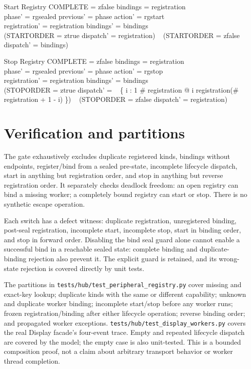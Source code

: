 \documentclass[a4paper,10pt,fleqn]{article}
\begin{document}
\begin{schema}{Start}
  \Delta Registry
\where
  COMPLETE = zfalse \lor \ran bindings = \ran registration \\
  phase' = rgsealed \land previous' = phase \land action' = rgstart \\
  registration' = registration \land bindings' = bindings \\
  (STARTORDER = ztrue \land dispatch' = registration) \lor
  \quad~ (STARTORDER = zfalse \land dispatch' = bindings)
\end{schema}
\begin{schema}{Stop}
  \Delta Registry
\where
  COMPLETE = zfalse \lor \ran bindings = \ran registration \\
  phase' = rgsealed \land previous' = phase \land action' = rgstop \\
  registration' = registration \land bindings' = bindings \\
  (STOPORDER = ztrue \land dispatch' =
  \quad~ \{ i : 1 \upto \# registration @
    i \mapsto registration(\# registration + 1 - i) \}) \lor
  \quad~ (STOPORDER = zfalse \land dispatch' = registration)
\end{schema}

\section{Verification and partitions}
The gate exhaustively excludes duplicate registered kinds, bindings without
endpoints, register/bind from a sealed pre-state, incomplete lifecycle dispatch,
start in anything but registration order, and stop in anything but reverse
registration order. It separately checks deadlock freedom: an open registry
can bind a missing worker; a completely bound registry can start or stop.
There is no synthetic escape operation.

Each switch has a defect witness: duplicate registration, unregistered binding,
post-seal registration, incomplete start, incomplete stop, start in binding
order, and stop in forward order. Disabling the bind seal guard alone cannot
enable a successful bind in a reachable sealed state: complete binding and
duplicate-binding rejection also prevent it. The explicit guard is retained,
and its wrong-state rejection is covered directly by unit tests.

The partitions in \texttt{tests/hub/test\_peripheral\_registry.py} cover missing
and exact-key lookup; duplicate kinds with the same or different capability;
unknown and duplicate worker binding; incomplete start/stop before any worker
runs; frozen registration/binding after either lifecycle operation; reverse
binding order; and propagated worker exceptions.
\texttt{tests/hub/test\_display\_workers.py} covers the real Display facade's
four-event trace. Empty and repeated lifecycle dispatch are covered by the
model; the empty case is also unit-tested. This is a bounded composition proof,
not a claim about arbitrary transport behavior or worker thread completion.
\end{document}
